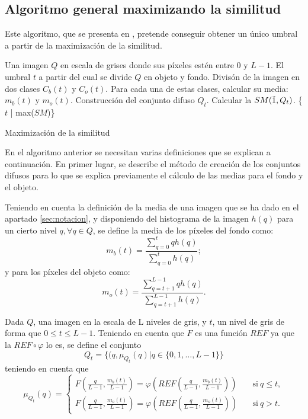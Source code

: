 \documentclass[main]{subfiles}
\begin{document}
\subsection{Algoritmo general maximizando la similitud}

Este algoritmo, que se presenta en \cite{art:barrenechea}, pretende conseguir obtener un único umbral a partir de la maximización de la similitud.

\begin{algorithm}
\begin{algorithmic}[1]
\REQUIRE Una imagen $Q$ en escala de grises donde sus píxeles estén entre $0$ y $L-1$.
\ENSURE El umbral $t$ a partir del cual se divide $Q$ en objeto y fondo.
\STATE Divisón de la imagen en dos clases $C_b(t)$ y $C_o(t)$. Para cada una de estas clases, calcular su media: $m_b(t)$ y $m_o(t)$.
\STATE Construcción del conjunto difuso $Q_t$.
\STATE Calcular la $SM(\tilda1, Q_t)$. \label{lin:alg1:similitud}
\ENDFOR
\RETURN \{$t$ | max($SM$)\}
\end{algorithmic}
\caption{Maximización de la similitud}\label{alg:algoritmo1}
\end{algorithm}

En el algoritmo anterior se necesitan varias definiciones que se explican a continuación. En primer lugar, se describe el método de creación de los conjuntos difusos para lo que se explica previamente el cálculo de las medias para el fondo y el objeto.

\begin{definition}\label{def:mediasmonoumbral}
Teniendo en cuenta la definición de la media de una imagen que se ha dado en el apartado \ref{sec:notacion}, y disponiendo del histograma de la imagen $h(q)$ para un cierto nivel $q, \forall q\in Q$, se define la media de los píxeles del fondo como:
$$m_b(t)=\frac{\sum_{q=0}^{t}qh(q)}{\sum_{q=0}^{t}h(q)};$$
y para los píxeles del objeto como:
$$m_o(t)=\frac{\sum_{q=t+1}^{L-1}qh(q)}{\sum_{q=t+1}^{L-1}h(q)}.$$
\end{definition}

\begin{definition}\label{def:conjuntodifusomonoumbral}
Dada $Q$, una imagen en la escala de L niveles de gris, y $t$, un nivel de gris de forma que $0\leq t\leq L-1$. Teniendo en cuenta que $F$ es una función $REF$ ya que la $REF \circ \varphi$ lo es, se define el conjunto
$$Q_t = \{(q, \mu_{Q_t}(q)|q\in \{0,1,\dots, L-1\}\}$$
teniendo en cuenta que
$$\mu_{Q_t}(q) = \left\{ \begin{aligned}
    F \left(\frac{q}{L-1}, \frac{m_b(t)}{L-1} \right) = \varphi\left(REF\left(\frac{q}{L-1}, \frac{m_b(t)}{L-1} \right)\right) & \quad\text{si}\ q\leq t,\\
    F \left(\frac{q}{L-1}, \frac{m_o(t)}{L-1} \right) = \varphi\left(REF\left(\frac{q}{L-1}, \frac{m_o(t)}{L-1} \right)\right) & \quad\text{si}\ q> t.
 \end{aligned}\right.$$
 \end{definition}
\end{document}
